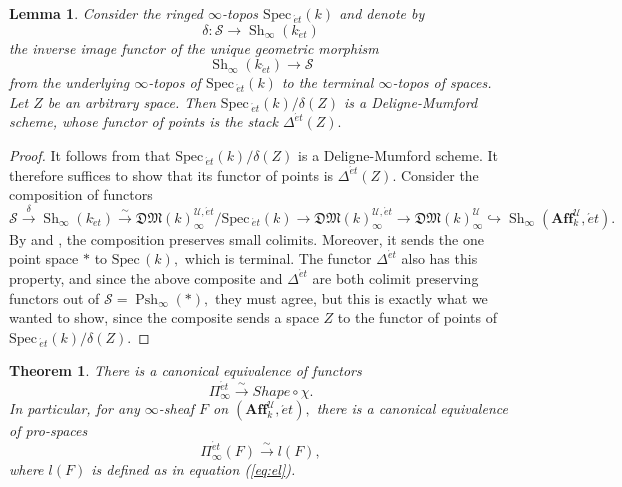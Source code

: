 \documentclass[12pt]{amsart}
\newtheorem{lemma}[dummy]{Lemma}
\newtheorem{theorem}[dummy]{Theorem}
\theoremstyle{definition}
\newcommand{\cS}{\mathcal{S}}
\newcommand{\cU}{\mathcal{U}}
\newcommand{\Affku}{\mathbf{Aff}^{\cU}_{k}}
\newcommand{\Spec}{\mathrm{Spec}\,}
\newcommand{\Sh}{\operatorname{Sh}}
\newcommand{\et}{\acute{e}t}
\renewcommand{\i}{\infty}
\def\Pshi{\operatorname{Psh}_\i}
\def\Shi{\Sh_\i}
\def\Shape{\mathit{Shape}}
\begin{document}
 
\begin{lemma}
Consider the ringed $\i$-topos $\Spec_{\et}\left(k\right)$ and denote by $$\delta:\cS \to \Shi\left(k_{\et}\right)$$ the inverse image functor of the unique geometric morphism $$\Shi\left(k_{\et}\right) \to \cS$$ from the underlying $\infty$-topos of $\Spec_{\et}\left(k\right)$ to the terminal $\i$-topos of spaces. Let $Z$ be an arbitrary space. Then $\Spec_{\et}\left(k\right)/\delta\left(Z\right)$ is a Deligne-Mumford scheme, whose functor of points is the stack $\Delta^{\et}\left(Z\right).$
\end{lemma}

\begin{proof}
It follows from \cite[Proposition 2.3.10]{dagv} that $\Spec_{\et}\left(k\right)/\delta\left(Z\right)$ is a Deligne-Mumford scheme. It therefore suffices to show that its functor of points is $\Delta^{\et}\left(Z\right)$. Consider the composition of functors
$$\cS \stackrel{\delta}{\longrightarrow} \Shi\left(k_{\et}\right) \stackrel{\sim}{\longrightarrow} \mathfrak{DM}\left(k\right)_\i^{\cU,\et}/\Spec_{\et}\left(k\right) \to \mathfrak{DM}\left(k\right)_\i^{\cU,\et} \to \mathfrak{DM}\left(k\right)_\i^{\cU} \hookrightarrow \Shi\left(\Affku,\et\right).$$
By \cite[Proposition 2.3.5]{dagv} and \cite[Proposition 5.2.11]{higherdave}, the composition preserves small colimits. Moreover, it sends the one point space $*$ to $\Spec\left(k\right),$ which is terminal. The functor $\Delta^{\et}$ also has this property, and since the above composite and $\Delta^{\et}$ are both colimit preserving functors out of $\cS=\Pshi\left(*\right),$ they must agree, but this is exactly what we wanted to show, since the composite sends a space $Z$ to the functor of points of $\Spec_{\et}\left(k\right)/\delta\left(Z\right).$
\end{proof}

 \begin{theorem}\label{thm: concrete}
 There is a canonical equivalence of functors $$\Pi^{\et}_\i \stackrel{\sim}{\longrightarrow} \Shape \circ \chi .$$ In particular, for any $\i$-sheaf $F$ on $\left(\Affku,\et\right),$ there is a canonical equivalence of pro-spaces $$\Pi^{\et}_\i\left(F\right) \stackrel{\sim}{\longrightarrow} l\left(F\right),$$ where $l\left(F\right)$ is defined as in equation (\ref{eq:el}).
 \end{theorem}
\end{document}
